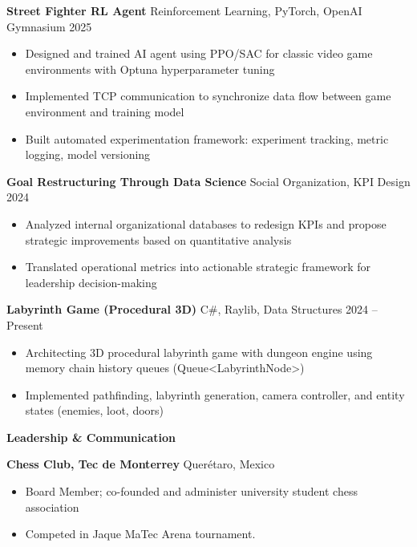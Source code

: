 \documentclass[11pt]{article}
\begin{document}
\vspace{6pt}

\textbf{Street Fighter RL Agent} \hfill Reinforcement Learning, PyTorch, OpenAI Gymnasium \hfill 2025
\begin{itemize}[noitemsep, topsep=0pt, partopsep=0pt, parsep=0pt]
    \item Designed and trained AI agent using PPO/SAC for classic video game environments with Optuna hyperparameter tuning
    \item Implemented TCP communication to synchronize data flow between game environment and training model
    \item Built automated experimentation framework: experiment tracking, metric logging, model versioning
\end{itemize}

\vspace{6pt}

\textbf{Goal Restructuring Through Data Science} \hfill Social Organization, KPI Design \hfill 2024
\begin{itemize}[noitemsep, topsep=0pt, partopsep=0pt, parsep=0pt]
    \item Analyzed internal organizational databases to redesign KPIs and propose strategic improvements based on quantitative analysis
    \item Translated operational metrics into actionable strategic framework for leadership decision-making
\end{itemize}

\vspace{6pt}

\textbf{Labyrinth Game (Procedural 3D)} \hfill C\#, Raylib, Data Structures \hfill 2024 – Present
\begin{itemize}[noitemsep, topsep=0pt, partopsep=0pt, parsep=0pt]
    \item Architecting 3D procedural labyrinth game with dungeon engine using memory chain history queues (Queue<LabyrinthNode>)
    \item Implemented pathfinding, labyrinth generation, camera controller, and entity states (enemies, loot, doors)
\end{itemize}

\vspace{12pt}

\begin{center}
    \textbf{Leadership \& Communication}
\end{center}

\textbf{Chess Club, Tec de Monterrey} \hfill Querétaro, Mexico
\begin{itemize}[noitemsep, topsep=0pt, partopsep=0pt, parsep=0pt]
    \item Board Member; co-founded and administer university student chess association
    \item Competed in Jaque MaTec Arena tournament.
\end{itemize}
\end{document}
